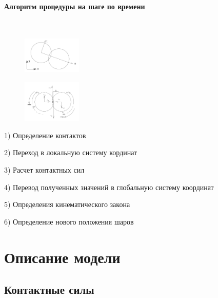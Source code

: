 \documentclass[c]{beamer}  %
\begin{document}
\begin{frame}
\frametitle{\insertsection} 
\framesubtitle{Алгоритм процедуры на шаге по времени}
$\qquad \qquad \qquad\qquad$
\begin{figure}
\includegraphics[width=0.25\textwidth]{local}
\end{figure}
\begin{figure}
\includegraphics[width=0.25\textwidth]{sily}
\end{figure}
1) Определение контактов


2) Переход в локальную систему кординат

3) Расчет контактных сил

4) Перевод полученных значений в глобальную систему координат

5) Определения кинематического закона

6) Определение нового положения шаров

\end{frame}


\section{Описание модели}

\subsection{Контактные силы}
\end{document}
